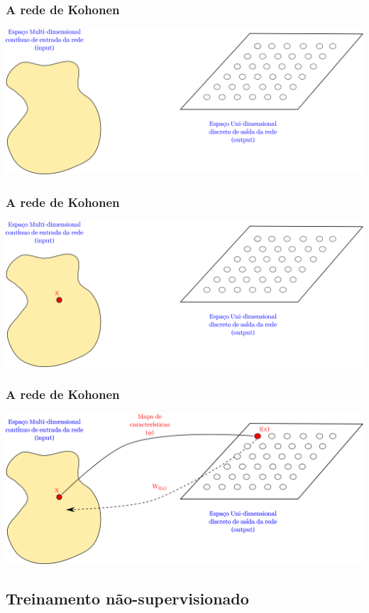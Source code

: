 \documentclass[10pt]{beamer} %
\begin{document}
\begin{frame}
	\frametitle{A rede de Kohonen}
	\includegraphics[scale=0.5]{Imagens/IntroKoho2.png} 
	
\end{frame}


\begin{frame}
	\frametitle{A rede de Kohonen}
	\includegraphics[scale=0.5]{Imagens/IntroKoho3.png} 
	
\end{frame}

\begin{frame}
	\frametitle{A rede de Kohonen}
	\includegraphics[scale=0.5]{Imagens/IntroKoho4.png} 
	
\end{frame}


\subsection{Treinamento não-supervisionado}
\end{document}
